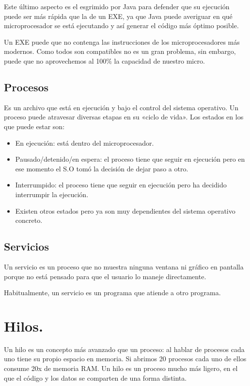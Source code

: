 \documentclass[letterpaper,10pt,spanish]{sphinxmanual}
\begin{document}
Este último aspecto es el esgrimido por Java para defender que su ejecución puede ser más rápida que la de un EXE, ya que Java puede averiguar en qué microprocesador se está ejecutando y así generar el código más óptimo posible.

Un EXE puede que no contenga las instrucciones de los microprocesadores más modernos. Como todos son compatibles no es un gran problema, sin embargo, puede que no aprovechemos al 100\% la capacidad de nuestro micro.


\subsection{Procesos}
\label{\detokenize{textos/tema1:procesos}}
Es un archivo que está en ejecución y bajo el control del sistema operativo. Un proceso puede atravesar diversas etapas en su «ciclo de vida». Los estados en los que puede estar son:
\begin{itemize}
\item {} 
En ejecución: está dentro del microprocesador.

\item {} 
Pausado/detenido/en espera: el proceso tiene que seguir en ejecución pero en ese momento el S.O tomó la decisión de dejar paso a otro.

\item {} 
Interrumpido: el proceso tiene que seguir en ejecución pero  ha decidido interrumpir la ejecución.

\item {} 
Existen otros estados pero ya son muy dependientes del sistema operativo concreto.

\end{itemize}


\subsection{Servicios}
\label{\detokenize{textos/tema1:servicios}}
Un servicio es un proceso que no muestra ninguna ventana ni gráfico en pantalla porque no está pensado para que el usuario lo maneje directamente.

Habitualmente, un servicio es un programa que atiende a otro programa.


\section{Hilos.}
\label{\detokenize{textos/tema1:hilos}}
Un hilo es un concepto más avanzado que un proceso: al hablar de procesos cada uno tiene su propio espacio en memoria. Si abrimos 20 procesos cada uno de ellos consume 20x de memoria RAM. Un hilo es un proceso mucho más ligero, en el que el código y los datos se comparten de una forma distinta.
\end{document}
